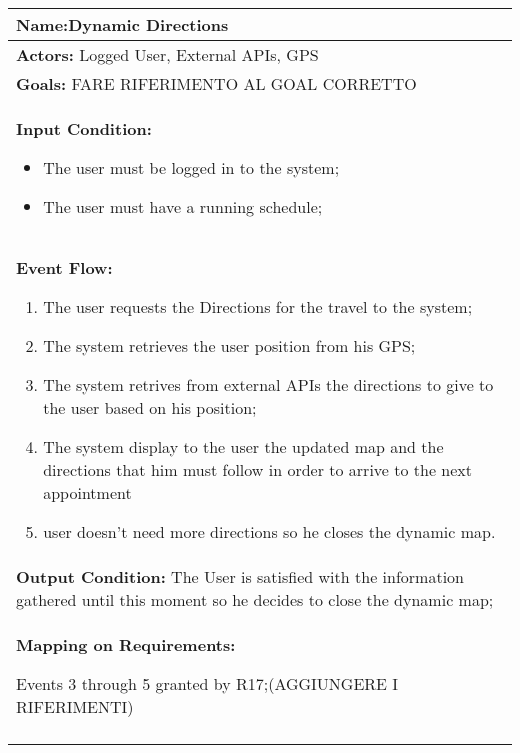 \begin{longtable}{|p{14cm}|} \hline

\textbf{Name:}Dynamic Directions\\ \hline

\textbf{Actors:} Logged User, External APIs, GPS \\ \hline

\textbf{Goals:} FARE RIFERIMENTO AL GOAL CORRETTO \\ \hline

\textbf{Input Condition:}

\begin{itemize}
\item The user must be logged in to the system;
\item The user must have a running schedule;
\end{itemize}
 \\ \hline

\textbf{Event Flow:}

\begin{enumerate}
\item The user requests the Directions for the travel to the system;
\item The system retrieves the user position from his GPS;
\item The system retrives from external APIs the directions to give to the user based on his position;
\item The system display to the user the updated map and the directions that him must follow in order to arrive to the next appointment
\item user doesn't need more directions so he closes the dynamic map.
\end{enumerate}	\\ \hline

\textbf{Output Condition:} The User is satisfied with the information gathered until this moment so he decides to close the dynamic map; \\ \hline

%

\textbf{Mapping on Requirements:}

Events 3 through 5 granted by R17;(AGGIUNGERE I RIFERIMENTI) \\\\ \hline

\end{longtable}

